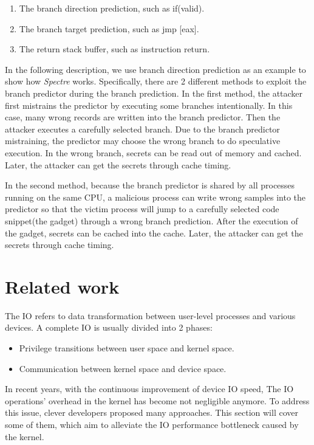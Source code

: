 \begin{enumerate}
  \item The branch direction prediction,  such as if(valid).
  \item The branch target prediction, such as jmp [eax].
  \item The return stack buffer, such as instruction return.
\end{enumerate}
In the following description, we use branch direction prediction as an example to show 
how \emph{Spectre} works.  Specifically, there are 2 different methods to exploit the branch 
predictor during the branch prediction.  In the first method, the attacker first mistrains 
the predictor by executing some branches intentionally.  In this case, many wrong records 
are written into the branch predictor. Then the attacker executes a carefully selected branch. 
Due to the branch predictor mistraining, the predictor may choose the wrong branch to do 
speculative execution.  In the wrong branch, secrets can be read out of memory and cached. 
Later, the attacker can get the secrets through cache timing.

In the second method, 
because the branch predictor is shared by all processes running on the same CPU, 
a malicious process can write wrong samples into the predictor so that the victim process will 
jump to a carefully selected code snippet(the gadget) through a wrong branch prediction. 
After the execution of the gadget, secrets can be cached into the cache. Later, the attacker 
can get the secrets through cache timing.

\section{Related work}
The IO refers to data transformation between user-level processes 
and various devices. A complete IO is usually divided into 2 phases:
\begin{itemize}
  \item Privilege transitions between user space and kernel space.
  \item Communication between kernel space and device space.
\end{itemize}  
In recent years, with the continuous improvement of device IO speed, 
The IO operations' overhead in the kernel has become not negligible anymore. 
To address this issue, clever developers proposed many approaches. 
This section will cover some of them, which aim to alleviate the IO 
performance bottleneck caused by the kernel.

